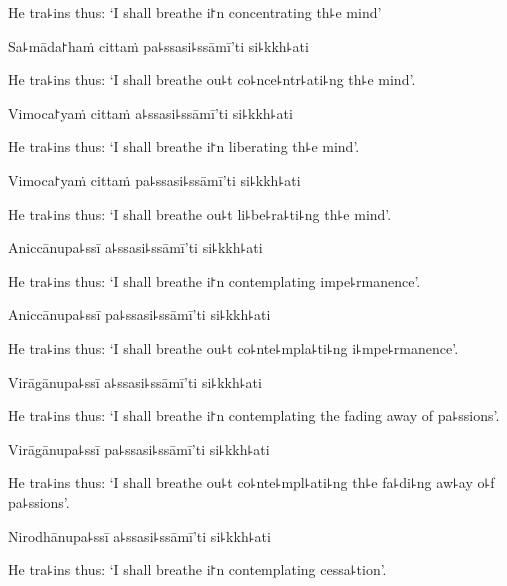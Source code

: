 \begin{english}
  He tra꜕ins thus: `I shall breathe i꜓n concentrating th꜕e mind'
\end{english}

Sa꜕māda꜓haṁ cittaṁ pa꜕ssasi꜕ssāmī'ti si꜕kkh꜕ati

\begin{english}
  He tra꜕ins thus: `I shall breathe ou꜕t co꜕nce꜕ntr꜕ati꜕ng th꜕e mind'.
\end{english}

Vimoca꜓yaṁ cittaṁ a꜕ssasi꜕ssāmī'ti si꜕kkh꜕ati

\begin{english}
  He tra꜕ins thus: `I shall breathe i꜓n liberating th꜕e mind'.
\end{english}

Vimoca꜓yaṁ cittaṁ pa꜕ssasi꜕ssāmī'ti si꜕kkh꜕ati

\begin{english}
  He tra꜕ins thus: `I shall breathe ou꜕t li꜕be꜕ra꜕ti꜕ng th꜕e mind'.
\end{english}

Aniccānupa꜕ssī a꜕ssasi꜕ssāmī'ti si꜕kkh꜕ati

\begin{english}
  He tra꜕ins thus: `I shall breathe i꜓n contemplating impe꜕rmanence'.
\end{english}

Aniccānupa꜕ssī pa꜕ssasi꜕ssāmī'ti si꜕kkh꜕ati

\begin{english}
  He tra꜕ins thus: `I shall breathe ou꜕t co꜕nte꜕mpla꜕ti꜕ng i꜕mpe꜕rmanence'.
\end{english}

Virāgānupa꜕ssī a꜕ssasi꜕ssāmī'ti si꜕kkh꜕ati

\begin{english}
  He tra꜕ins thus: `I shall breathe i꜓n contemplating the fading away of pa꜕ssions'.
\end{english}

Virāgānupa꜕ssī pa꜕ssasi꜕ssāmī'ti si꜕kkh꜕ati

\begin{english}
  He tra꜕ins thus: `I shall breathe ou꜕t co꜕nte꜕mpl꜕ati꜕ng th꜕e fa꜕di꜕ng aw꜕ay o꜕f pa꜕ssions'.
\end{english}

Nirodhānupa꜕ssī a꜕ssasi꜕ssāmī'ti si꜕kkh꜕ati

\begin{english}
  He tra꜕ins thus: `I shall breathe i꜓n contemplating cessa꜕tion'.
\end{english}

